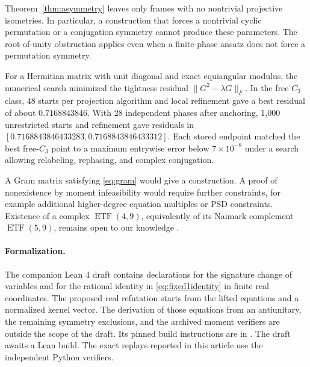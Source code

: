Theorem~\ref{thm:asymmetry} leaves only frames with no nontrivial projective isometries. In particular, a construction that forces a nontrivial cyclic permutation or a conjugation symmetry cannot produce these parameters. The root-of-unity obstruction applies even when a finite-phase ansatz does not force a permutation symmetry.

For a Hermitian matrix with unit diagonal and exact equiangular modulus, the numerical search minimized the tightness residual $\|G^2-\lambda G\|_F$. In the free $C_3$ class, 48 starts per projection algorithm and local refinement gave a best residual of about $0.7168843846$. With 28 independent phases after anchoring, 1{,}000 unrestricted starts and refinement gave residuals in $[0.7168843846433283,0.7168843846433312]$. Each stored endpoint matched the best free-$C_3$ point to a maximum entrywise error below $7\times10^{-8}$ under a search allowing relabeling, rephasing, and complex conjugation.

A Gram matrix satisfying \eqref{eq:gram} would give a construction. A proof of nonexistence by moment infeasibility would require further constraints, for example additional higher-degree equation multiples or PSD constraints. Existence of a complex $\operatorname{ETF}(4,9)$, equivalently of its Naimark complement $\operatorname{ETF}(5,9)$, remains open to our knowledge \cite{fickusmixon}.

\paragraph{Formalization.}
The companion Lean 4 draft contains declarations for the signature change of variables and for the rational identity in \eqref{eq:fixed1identity} in finite real coordinates. The proposed real refutation starts from the lifted equations and a normalized kernel vector. The derivation of those equations from an antiunitary, the remaining symmetry exclusions, and the archived moment verifiers are outside the scope of the draft. Its pinned build instructions are in . The draft awaits a Lean build. The exact replays reported in this article use the independent Python verifiers.
